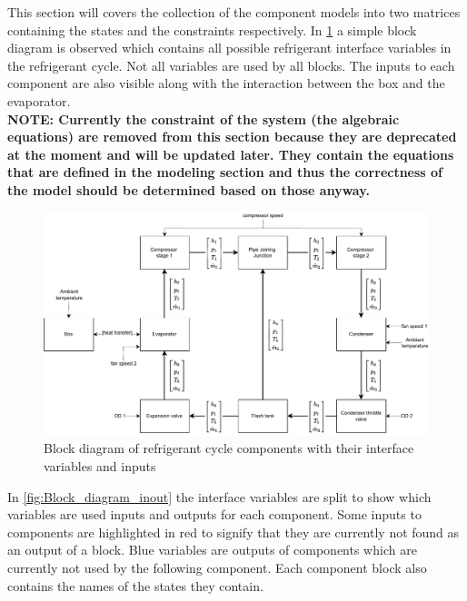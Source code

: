 This section will covers the collection of the component models into two matrices containing the states and the constraints respectively. In \cref{fig:Block_diagram} a simple block diagram is observed which contains all possible refrigerant interface variables in the refrigerant cycle. Not all variables are used by all blocks. The inputs to each component are also visible along with the interaction between the box and the evaporator.\\

\textbf{NOTE: Currently the constraint of the system (the algebraic equations) are removed from this section because they are deprecated at the moment and will be updated later. They contain the equations that are defined in the modeling section and thus the correctness of the model should be determined based on those anyway.}

\begin{figure}[h!]
	\centering
	\includegraphics[width=1\textwidth]{Graphics/Block_Diagram.pdf}
	\caption{Block diagram of refrigerant cycle components with their interface variables and inputs}
	\label{fig:Block_diagram}
\end{figure}

In \cref{fig:Block_diagram_inout} the interface variables are split to show which variables are used inputs and outputs for each component. Some inputs to components are highlighted in red to signify that they are currently not found as an output of a block. Blue variables are outputs of components which are currently not used by the following component. Each component block also contains the names of the states they contain.

